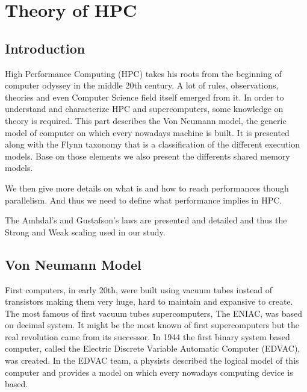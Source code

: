 
\chapter{Theory of HPC}

\section{Introduction}

High Performance Computing (HPC) takes his roots from the beginning of computer odyssey in the middle 20th century.
A lot of rules, observations, theories and even Computer Science field itself emerged from it. 
In order to understand and characterize HPC and supercomputers, some knowledge on theory is required. 
This part describes the Von Neumann model, the generic model of computer on which every nowadays machine is built.
It is presented along with the Flynn taxonomy that is a classification of the different execution models. 
Base on those elements we also present the differents shared memory models. 

We then give more details on what is and how to reach performances though parallelism. 
And thus we need to define what performance implies in HPC. 

The Amhdal's and Gustafson's laws are presented and detailed and thus the Strong and Weak scaling used in our study. 

\section{Von Neumann Model}
First computers, in early 20th, were built using vacuum tubes instead of transistors making them very huge, hard to maintain and expansive to create.
The most famous of first vacuum tubes supercomputers, The ENIAC, was based on decimal system.
It might be the most known of first supercomputers but the real revolution came from its successor.
In 1944 the first binary system based computer, called the Electric Discrete Variable Automatic Computer (EDVAC), was created. 
In the EDVAC team, a physists described the logical model of this computer and provides a model on which every nowadays computing device is based. 

